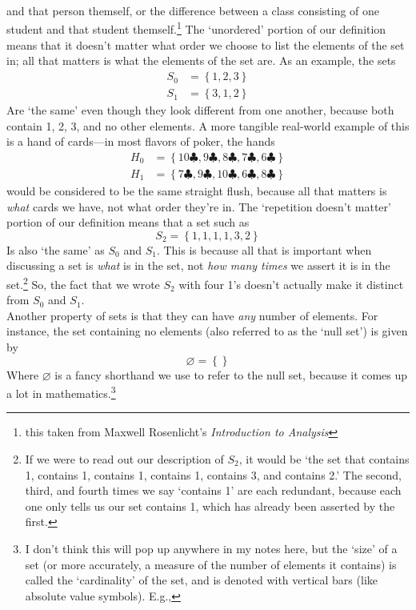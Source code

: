 \documentclass[10pt]{article}
\theoremstyle{definition}
\newcommand{\set}[1]{\left\{ #1 \right\}}
\begin{document}
{and that person themself, or the difference between a class consisting
of one student and that student themself.\footnote{this taken from
  Maxwell Rosenlicht's \textit{Introduction to Analysis}}  The
`unordered' portion of our definition means that it doesn't matter
what order we choose to list the elements of the set in; all that
matters is what the elements of the set are.  As an example, the sets
\begin{align*}
S_0 &= \set{1,2,3}\\
S_1 &= \set{3,1,2}
\end{align*}
Are `the same' even though they look different from one another,
because both contain 1, 2, 3, and no other elements.  A more tangible
real-world example of this is a hand of cards---in most flavors of
poker, the hands
\begin{align*}
H_0 &= \set{10\clubsuit,9\clubsuit, 8\clubsuit, 7\clubsuit, 6\clubsuit}\\
H_1 &= \set{7\clubsuit,9\clubsuit, 10\clubsuit, 6\clubsuit, 8\clubsuit}
\end{align*}
would be considered to be the same straight flush, because all that
matters is \emph{what} cards we have, not what order they're in.  The
`repetition doesn't matter' portion of our definition means that a set
such as
\[S_2 = \set{1,1,1,1,3,2}\]
Is also `the same' as $S_0$ and $S_1$.  This is because all that is
important when discussing a set is \emph{what} is in the set, not
\emph{how many times} we assert it is in the set.\footnote{If we were
  to read out our description of $S_2$, it would be `the set that
  contains 1, contains 1, contains 1, contains 1, contains 3, and
  contains 2.'  The second, third, and fourth times we say `contains
  1' are each redundant, because each one only tells us our set
  contains 1, which has already been asserted by the first.}  So, the
fact that we wrote $S_2$ with four 1's doesn't actually make it
distinct from $S_0$ and $S_1$.
\\
Another property of sets is that they can have \emph{any} number of
elements.  For instance, the set containing no elements (also referred
to as the `null set') is given by
\[\varnothing = \set{}\]
Where $\varnothing$ is a fancy shorthand we use to refer to the null
set, because it comes up a lot in mathematics.\footnote{I don't think
  this will pop up anywhere in my notes here, but the `size' of a set
  (or more accurately, a measure of the number of elements it
  contains) is called the `cardinality' of the set, and is denoted
  with vertical bars (like absolute value symbols).  E.g.,
}}
\end{document}
